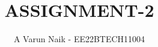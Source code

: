 \documentclass[journal,12pt,twocolumn]{IEEEtran}
\theoremstyle{remark}
\begin{document}
%




\vspace{3cm}

\title{
ASSIGNMENT-2
}
\author{A Varun Naik - EE22BTECH11004}


\maketitle

\newpage


\bigskip

\renewcommand{\thefigure}{\theenumi}
\renewcommand{\thetable}{\theenumi}


\providecommand{\pr}[1]{\ensuremath{\Pr\left(#1\right)}}
\providecommand{\prt}[2]{\ensuremath{p_{#1}^{\left(#2\right)} }}        %
\providecommand{\qfunc}[1]{\ensuremath{Q\left(#1\right)}}
\providecommand{\sbrak}[1]{\ensuremath{{}\left[#1\right]}}
\providecommand{\lsbrak}[1]{\ensuremath{{}\left[#1\right.}}
\providecommand{\rsbrak}[1]{\ensuremath{{}\left.#1\right]}}
\providecommand{\brak}[1]{\ensuremath{\left(#1\right)}}
\providecommand{\lbrak}[1]{\ensuremath{\left(#1\right.}}
\providecommand{\rbrak}[1]{\ensuremath{\left.#1\right)}}
\providecommand{\cbrak}[1]{\ensuremath{\left\{#1\right\}}}
\providecommand{\lcbrak}[1]{\ensuremath{\left\{#1\right.}}
\providecommand{\rcbrak}[1]{\ensuremath{\left.#1\right\}}}
\newcommand{\sgn}{\mathop{\mathrm{sgn}}}
\providecommand{\abs}[1]{\left\vert#1\right\vert}
\providecommand{\res}[1]{\Res\displaylimits_{#1}} 
\providecommand{\norm}[1]{\left\lVert#1\right\rVert}
\providecommand{\mtx}[1]{\mathbf{#1}}
\providecommand{\mean}[1]{E\left[ #1 \right]}
\providecommand{\cond}[2]{#1\middle|#2}
\providecommand{\fourier}{\overset{\mathcal{F}}{ \rightleftharpoons}}
\newenvironment{amatrix}[1]{%
  \left(\begin{array}{@{}*{#1}{c}|c@{}}
}{%
  \end{array}\right)
}
\end{document}
